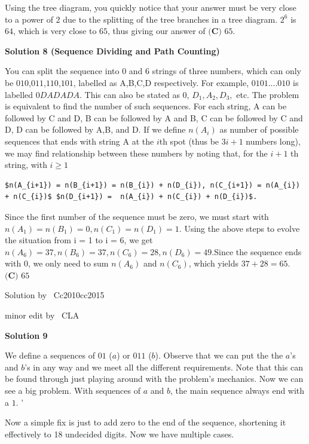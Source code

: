 \begin{enumerate}
Using the tree diagram, you quickly notice that your answer must be very close to a power of $2$ due to the splitting of the tree branches in a tree diagram. $2^6$ is $64$, which is very close to $65$, thus giving our answer of $\boxed{\textbf{(C) }65}$.

 


 



\textbf{Solution 8 (Sequence Dividing and Path Counting)}

You can split the sequence into $0$ and $6$ strings of three numbers, which can only be $010$,$011$,$110$,$101$, labelled as A,B,C,D respectively. For example, $0101....010$ is labelled $0DADADA$. This can also be stated as 0, $D_{1}, A_{2}, D_{3},$ etc. The problem is equivalent to find the number of such sequences. For each string, A can be followed by C and D, B can be followed by A and B, C can be followed by C and D, D can be followed by A,B, and D.  If we define $n(A_{i})$ as number of possible sequences that ends with string A at the $i$th spot (thus be $3i+1$ numbers long), we may find relationship between these numbers by noting that, for the $i+1$ th string, with $i \geq 1$
\begin{verbatim}
$n(A_{i+1}) = n(B_{i+1}) = n(B_{i}) + n(D_{i}), n(C_{i+1}) = n(A_{i}) + n(C_{i})$ $n(D_{i+1}) =  n(A_{i}) + n(C_{i}) + n(D_{i})$. 
\end{verbatim}

Since the first number of the sequence must be zero, we must start with $n(A_1) = n(B_1) = 0, n(C_1) = n(D_1) = 1$. Using the above steps to evolve the situation from i = 1 to i = 6, we get $n(A_{6}) = 37, n(B_{6}) = 37, n(C_{6}) = 28, n(D_{6}) = 49$.Since the sequence ends with 0, we only need to sum $n(A_{6})$ and $n(C_{6})$, which yields $37+28=65$.  $\boxed{\textbf{(C) }65}$

 Solution by ~Cc2010cc2015

 minor edit by ~CLA

 



\textbf{Solution 9}

We define a sequences of $01$ ($a$) or $011$ ($b$). Observe that we can put the the $a$'s and $b$'s in any way and we meet all the different requirements. Note that this can be found through just playing around with the problem's mechanics. Now we can see a big problem. With sequences of $a$ and $b$, the main sequence always end with a $1$. '

 Now a simple fix is just to add zero to the end of the sequence, shortening it effectively to 18 undecided digits. Now we have multiple cases.


\end{enumerate}
